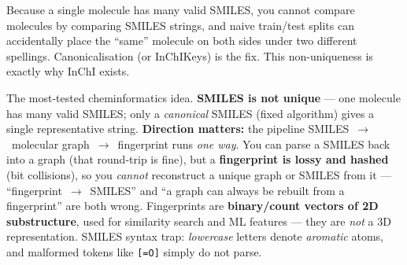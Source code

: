 \documentclass[11pt, oneside]{book}
\begin{document}
\begin{notebox}[title={SMILES is non-unique --- mind the gap}]
Because a single molecule has many valid SMILES, you cannot compare molecules by
comparing SMILES strings, and naive train/test splits can accidentally place the
``same'' molecule on both sides under two different spellings. Canonicalisation
(or InChIKeys) is the fix. This non-uniqueness is exactly why InChI exists.
\end{notebox}

\begin{starbox}[title={Exam-critical: representations --- what's reversible, what isn't}]
The most-tested cheminformatics idea. \textbf{SMILES is not unique} --- one molecule
has many valid SMILES; only a \emph{canonical} SMILES (fixed algorithm) gives a
single representative string. \textbf{Direction matters:} the pipeline
SMILES~$\to$~molecular graph~$\to$~fingerprint runs \emph{one way}. You can parse a
SMILES back into a graph (that round-trip is fine), but a \textbf{fingerprint is
lossy and hashed} (bit collisions), so you \emph{cannot} reconstruct a unique graph
or SMILES from it --- ``fingerprint~$\to$~SMILES'' and ``a graph can always be
rebuilt from a fingerprint'' are both wrong. Fingerprints are \textbf{binary/count
vectors of 2D substructure}, used for similarity search and ML features --- they are
\emph{not} a 3D representation. SMILES syntax trap: \emph{lowercase} letters denote
\emph{aromatic} atoms, and malformed tokens like \texttt{[=O]} simply do not parse.
\end{starbox}
\newpage
\end{document}
